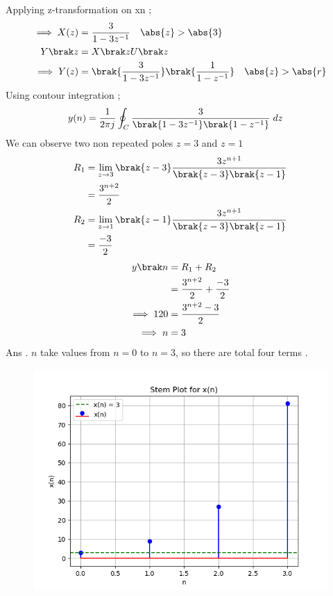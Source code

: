 \documentclass[journal,12pt,twocolumn]{IEEEtran}
\theoremstyle{remark}
\begin{document}
Applying z-transformation on x\brak n ;
\begin{align}
\implies X(z) &=\frac{3}{1-3z^{-1}} \quad \abs{z} > \abs{3}\\
Y \brak z &= X\brak zU\brak z\\
\implies Y(z)&=\brak{\frac{3}{1-3 z^{-1}}}\brak{\frac{1}{1- z^{-1}}}  \quad \abs{z} > \abs{r}
\end{align}
Using contour integration  ;
\begin{align}
   y(n) &=\frac{1}{2\pi j}\oint_{C}{\frac{3}{\brak{1-3 z^{-1}}\brak{1- z^{-1}}}}  \;dz 
\end{align}
We can observe two non repeated poles $z=3$ and $z=1$
\begin{align}
    R_1&=\lim\limits_{z\to 3} \brak{z-3} \frac{3 z^{n+1}}{\brak{z-3}\brak{z-1}}\\
  &=\frac{3^{n+2}}{2}\\
   R_2&=\lim\limits_{z\to 1} \brak{z-1} \frac{3 z^{n+1}}{\brak{z-3}\brak{z-1}}\\
  &=\frac{-3}{2}
      \end{align}
      \begin{align}
  y\brak n&= R_1+R_2\\
   &=\frac{3^{n+2}}{2}+\frac{-3}{2} \\
  \implies 120&=\frac{3^{n+2}-3}{2} \\
   \implies n&=3
\end{align}
Ans . $n$ take values from $n=0$ to  $n=3$, so there are total four terms .
\newpage
\begin{figure}
   \includegraphics[width=1\linewidth]{figs/i1.png}
\end{figure}
\end{document}
